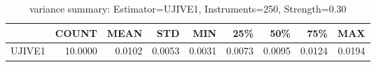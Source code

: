 \begin{table}[ht]
\centering
\caption{variance summary: Estimator=UJIVE1, Instruments=250, Strength=0.30}
\begin{tabular}{lrrrrrrrr}
\toprule
 & COUNT & MEAN & STD & MIN & 25\% & 50\% & 75\% & MAX \\
\midrule
UJIVE1 & 10.0000 & 0.0102 & 0.0053 & 0.0031 & 0.0073 & 0.0095 & 0.0124 & 0.0194 \\
\bottomrule
\end{tabular}
\end{table}
